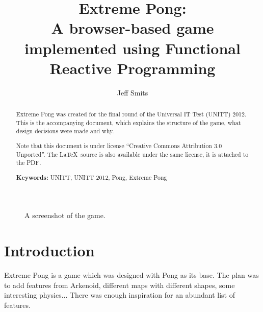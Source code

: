 \documentclass[a4paper]{article}
\begin{document}
\title{Extreme Pong: \\
A browser-based game implemented using Functional Reactive Programming}
\author{Jeff Smits}
\date{}

\maketitle

\begin{abstract}
Extreme Pong was created for the final round of the Universal IT Test (UNITT)
 2012. This is the accompanying document, which explains the structure of the
 game, what design decisions were made and why. 

Note that this document is under license ``Creative Commons
 Attribution 3.0 Unported''. The \LaTeX\ source is also available
 under the same license, it is attached to the PDF. 

\smallskip
\noindent\textbf{Keywords:} UNITT, UNITT 2012, Pong, Extreme Pong
\end{abstract}

\begin{figure}[h]
\centering
\setlength\fboxsep{0pt}
\setlength\fboxrule{1pt}
\caption{A screenshot of the game. }
\label{fig:screenshot}
\end{figure}

\newpage

\section{Introduction}
Extreme Pong is a game which was designed with Pong as its base. The plan was to
 add features from Arkenoid, different maps with different shapes, some
 interesting physics... There was enough inspiration for an abundant list of
 features. 
\end{document}
